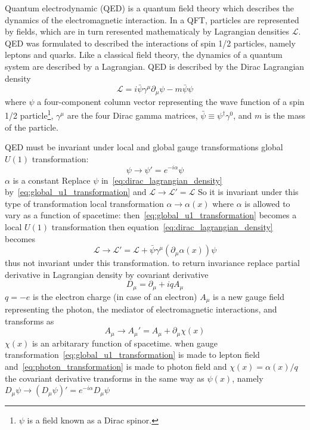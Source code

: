 Quantum electrodynamic (QED) is a quantum field theory which describes the dynamics of the electromagnetic interaction.
In a QFT, particles are represented by fields, which are in turn reresented mathematicaly by Lagrangian densities $\mathcal{L}$.
QED was formulated to described the interactions of spin 1/2 particles, namely leptons and quarks.
Like a classical field theory, the dynamics of a quantum system are described by a Lagrangian.
QED is described by the Dirac Lagrangian density
\begin{equation}\label{eq:dirac_lagrangian_density}
\mathcal{L}=i\bar{\psi}\gamma^{\mu}\partial_{\mu}\psi-m\bar{\psi}\psi
\end{equation}
where $\psi$ a four-component column vector representing the wave function of a spin 1/2 particle\footnote{$\psi$ is a field known as a Dirac spinor.}, $\gamma^{\mu}$ are the four Dirac gamma matrices, $\bar{\psi}\equiv\psi^{\dagger}\gamma^{0}$, and $m$ is the mass of the particle.



QED must be invariant under local and global gauge transformations
global $U\left(1\right)$ transformation:
	\begin{equation}\label{eq:global_u1_transformation}
		\psi\rightarrow\psi'=e^{-i\alpha}\psi
	\end{equation}
	$\alpha$ is a constant
	Replace $\psi$ in~\ref{eq:dirac_lagrangian_density} by~\ref{eq:global_u1_transformation} and $\mathcal{L}\rightarrow\mathcal{L}'=\mathcal{L}$
	So it is invariant under this type of transformation
local transformation $\alpha\rightarrow\alpha\left(x\right)$ where $\alpha$ is allowed to vary as a function of spacetime:
	then~\ref{eq:global_u1_transformation} becomes a local $U\left(1\right)$ transformation
	then equation~\ref{eq:dirac_lagrangian_density} becomes
	\begin{equation}\label{eq:local_transformation}
		\mathcal{L}\rightarrow\mathcal{L}'=\mathcal{L}+\bar{\psi}\gamma^{\mu}\left(\partial_{\mu}\alpha\left(x\right)\right)\psi
	\end{equation}
	thus not invariant under this transformation.
	to return invariance replace partial derivative in Lagrangian density by covariant derivative
	\begin{equation}\label{eq:covariant_derivative}
		D_{\mu}=\partial_{\mu}+iqA_{\mu}
	\end{equation}
	$q=-e$ is the electron charge (in case of an electron)
	$A_{\mu}$ is a new gauge field representing the photon, the mediator of electromagnetic interactions, and transforms as
	\begin{equation}\label{eq:photon_transformation}
		A_{\mu}{\rightarrow}A_{\mu}'=A_{\mu}+\partial_{\mu}\chi\left(x\right)
	\end{equation}
	$\chi\left(x\right)$ is an arbitarary function of spacetime.
	when gauge transformation~\ref{eq:global_u1_transformation} is made to lepton field and~\ref{eq:photon_transformation} is made to photon field and $\chi\left(x\right)=\alpha\left(x\right)/q$ the covariant derivative transforms in the same way as $\psi\left(x\right)$, namely $D_{\mu}\psi\rightarrow\left(D_{\mu}\psi\right)'=e^{-i\alpha}D_{\mu}\psi$

